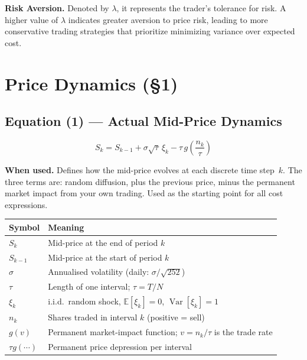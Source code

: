 \documentclass[11pt,a4paper]{article}
\begin{document}
\noindent\textbf{Risk Aversion.} Denoted by $\lambda$, it represents the trader's tolerance for risk. A higher value of $\lambda$ indicates greater aversion to price risk, leading to more conservative trading strategies that prioritize minimizing variance over expected cost.
\section{Price Dynamics (\texorpdfstring{\S}{§}1)}

\subsection*{Equation (1) — Actual Mid-Price Dynamics}

\begin{equation}
  S_k = S_{k-1} + \sigma\sqrt{\tau}\,\xi_k - \tau\,g\!\left(\frac{n_k}{\tau}\right)
\end{equation}

\textbf{When used.} Defines how the mid-price evolves at each discrete time step~$k$.
The three terms are: random diffusion, plus the previous price, minus the permanent
market impact from your own trading.  Used as the starting point for all cost expressions.

\begin{center}
\begin{tabular}{@{}L{3.5cm}L{10cm}@{}}
\toprule
\textbf{Symbol} & \textbf{Meaning} \\
\midrule
$S_k$ & Mid-price at the end of period $k$ \\
$S_{k-1}$ & Mid-price at the start of period $k$ \\
$\sigma$ & Annualised volatility (daily: $\sigma/\sqrt{252}$) \\
$\tau$ & Length of one interval; $\tau = T/N$ \\
$\xi_k$ & i.i.d.\ random shock, $\mathbb{E}[\xi_k]=0$, $\operatorname{Var}[\xi_k]=1$ \\
$n_k$ & Shares traded in interval $k$ (positive = sell) \\
$g(v)$ & Permanent market-impact function; $v = n_k/\tau$ is the trade rate \\
$\tau g(\cdots)$ & Permanent price depression per interval \\
\bottomrule
\end{tabular}
\end{center}
\end{document}
